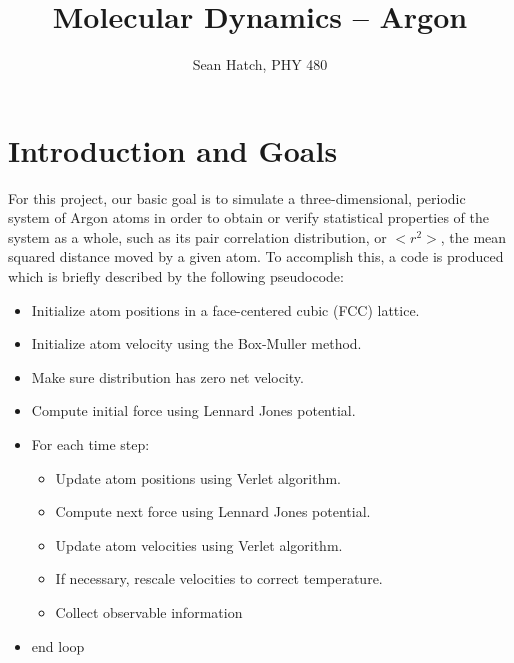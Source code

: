 \documentclass[letterpaper,12pt]{article}
\title{Molecular Dynamics -- Argon}
\author{Sean Hatch, PHY 480}
\begin{document}
	\renewcommand{\topfraction}{0.9}	%
    \renewcommand{\bottomfraction}{0.8}	%
    \setcounter{topnumber}{2}
    \setcounter{bottomnumber}{2}
    \setcounter{totalnumber}{2}     %
    \setcounter{dbltopnumber}{2}    %
    \renewcommand{\dbltopfraction}{0.9}	%
    \renewcommand{\textfraction}{0.07}	%
    \renewcommand{\floatpagefraction}{0.7}	%
    \renewcommand{\dblfloatpagefraction}{0.7}	%


\maketitle

\section{Introduction and Goals}

For this project, our basic goal is to simulate a three-dimensional, periodic system of Argon atoms in order to obtain or verify statistical properties of the system as a whole, such as its pair correlation distribution, or $<r^2>$, the mean squared distance moved by a given atom. To accomplish this, a code is produced which is briefly described by the following pseudocode:

\begin{itemize}
  \item Initialize atom positions in a face-centered cubic (FCC) lattice.
  \item Initialize atom velocity using the Box-Muller method.
  \item Make sure distribution has zero net velocity.
  \item Compute initial force using Lennard Jones potential.
  \item For each time step:
	\begin{itemize}
  	\item Update atom positions using Verlet algorithm.
  	\item Compute next force using Lennard Jones potential.
  	\item Update atom velocities using Verlet algorithm.
  	\item If necessary, rescale velocities to correct temperature.
	\item Collect observable information
	 
	\end{itemize}
\item end loop  
\end{itemize}
\end{document}
